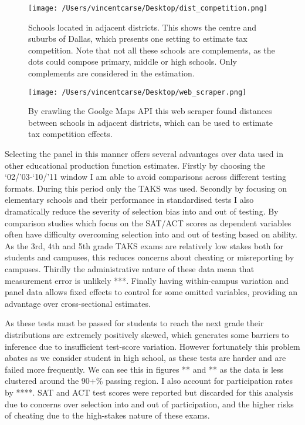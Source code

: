 \documentclass[11pt]{article}
\begin{document}
\begin{figure}
    \label{image-myimage}
    \texttt{[image: /Users/vincentcarse/Desktop/dist\_competition.png]}
    \caption{Schools located in adjacent districts. This shows the centre and suburbs of Dallas, which presents one setting to estimate tax competition. Note that not all these schools are complements, as the dots could compose primary, middle or high schools. Only complements are considered in the estimation.}
\end{figure}


\begin{figure}
    \label{image-myimage}
    \texttt{[image: /Users/vincentcarse/Desktop/web\_scraper.png]}
    \caption{By crawling the Goolge Maps API this web scraper found distances between schools in adjacent districts, which can be used to estimate tax competition effects.}
\end{figure}

Selecting the panel in this manner offers several advantages over data used in other educational production function estimates. Firstly by choosing the ‘02/’03-‘10/’11 window I am able to avoid comparisons across different testing formats. During this period only the TAKS was used. Secondly by focusing on elementary schools and their performance in standardised tests I also dramatically reduce the severity of selection bias into and out of testing. By comparison studies which focus on the SAT/ACT scores as dependent variables often have difficulty overcoming selection into and out of testing based on ability. As the 3rd, 4th and 5th grade TAKS exams are relatively low stakes both for students and campuses, this reduces concerns about cheating or misreporting by campuses. Thirdly the administrative nature of these data mean that measurement error is unlikely ***.  Finally having within-campus variation and panel data allows fixed effects to control for some omitted variables, providing an advantage over cross-sectional estimates. 

As these tests must be passed for students to reach the next grade their distributions are extremely positively skewed, which generates some barriers to inference due to insufficient test-score variation. However fortunately this problem abates as we consider student in high school, as these tests are harder and are failed more frequently. We can see this in figures ** and ** as the data is less clustered around the 90+\% passing region. I also account for participation rates by ****. SAT and ACT test scores were reported but discarded for this analysis due to concerns over selection into and out of participation, and the higher risks of cheating due to the high-stakes nature of these exams.
\end{document}
